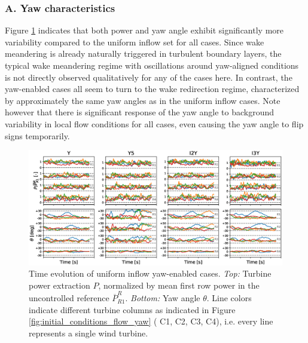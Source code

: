 	\subsubsection{A. Yaw characteristics}
	 Figure \ref{fig:dynamic_turb} indicates that both power and yaw angle exhibit significantly more variability compared to the uniform inflow set for all cases. Since wake meandering is already naturally triggered in turbulent boundary layers, the typical wake meandering regime with oscillations around yaw-aligned conditions is not directly observed qualitatively for any of the cases here. In contrast, the yaw-enabled cases all seem to turn to the wake redirection regime, characterized by approximately the same yaw angles as in the uniform inflow cases. Note however that there is significant response of the yaw angle to background variability in local flow conditions for all cases, even causing the yaw angle to flip signs temporarily. 
	\begin{figure}
		\includegraphics[width=\textwidth]{chapters/optimal_yaw_control/power_yaw_turb.eps}	
		\caption{Time evolution of uniform inflow yaw-enabled cases. \emph{Top: } Turbine power extraction $P$, normalized by mean first row power in the uncontrolled reference $\overline{P}_{R1}^R$. \emph{Bottom: } Yaw angle $\theta$. Line colors indicate different turbine columns as indicated in Figure \ref{fig:initial_conditions_flow_yaw} ({\color{C1} C1}, {\color{C2} C2}, {\color{C3} C3}, {\color{C4} C4}), i.e. every line represents a single wind turbine. \label{fig:dynamic_turb}}
	\end{figure}

